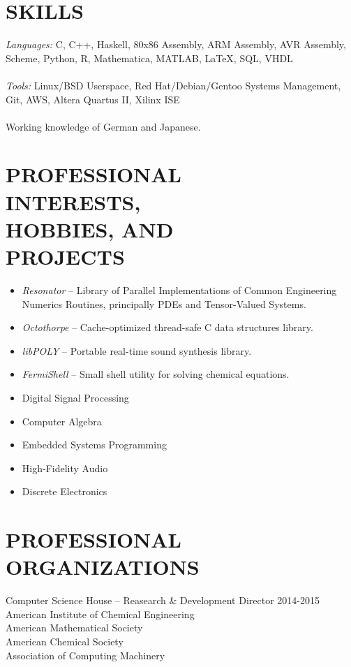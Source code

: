 \documentclass[line,margin]{res}
\begin{document}
\begin{resume}
\section{SKILLS} {\sl Languages:} C, C++, Haskell, 80x86 Assembly, ARM Assembly, AVR Assembly, Scheme, Python, R, Mathematica, MATLAB, \LaTeX, SQL, VHDL \\ \\
                 {\sl Tools:} Linux/BSD Userspace, Red Hat/Debian/Gentoo Systems Management, Git, AWS, Altera Quartus II, Xilinx ISE \\ \\
                 Working knowledge of German and Japanese.


\section{PROFESSIONAL \\ INTERESTS, \\ HOBBIES, AND \\ PROJECTS}
				\begin{itemize} \itemsep -2pt
				\item	\emph{Resonator} -- Library of Parallel Implementations of Common Engineering Numerics Routines, principally PDEs and Tensor-Valued Systems.
				\item	\emph{Octothorpe} -- Cache-optimized thread-safe C data structures library.
				\item	\emph{libPOLY} -- Portable real-time sound synthesis library.
				\item	\emph{FermiShell} -- Small shell utility for solving chemical equations.
				\item	Digital Signal Processing
				\item	Computer Algebra
				\item	Embedded Systems Programming
				\item	High-Fidelity Audio
				\item	Discrete Electronics
				\end{itemize}

\section{PROFESSIONAL ORGANIZATIONS}
Computer Science House -- Reasearch \& Development Director 2014-2015\\
American Institute of Chemical Engineering\\
American Mathematical Society\\
American Chemical Society\\
Association of Computing Machinery\\

\end{resume}
\end{document}
